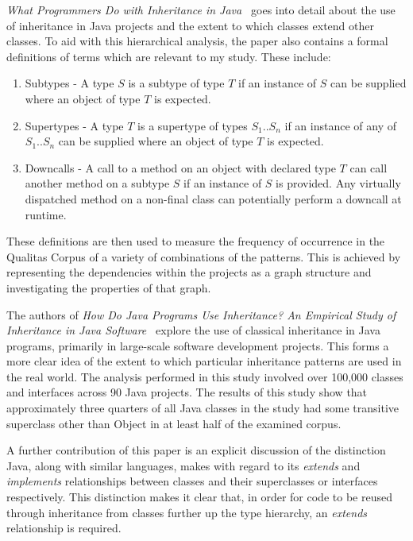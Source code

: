 \textit{What Programmers Do with Inheritance in Java~\cite{InheritanceInJava}} goes into detail about the use of inheritance in Java projects and the extent to which classes extend other classes. To aid with this hierarchical analysis, the paper also contains a formal definitions of terms which are relevant to my study. These include:
\begin{enumerate}
	\item Subtypes - A type $S$ is a subtype of type $T$ if an instance of $S$ can be supplied where an object of type $T$ is expected.
	\item Supertypes - A type $T$ is a supertype of types $S_1..S_n$ if an instance of any of $S_1..S_n$ can be supplied where an object of type $T$ is expected.
	\item Downcalls - A call to a method on an object with declared type $T$ can call another method on a subtype $S$ if an instance of $S$ is provided. Any virtually dispatched method on a non-final class can potentially perform a downcall at runtime.
\end{enumerate}

These definitions are then used to measure the frequency of occurrence in the Qualitas Corpus of a variety of combinations of the patterns. This is achieved by representing the dependencies within the projects as a graph structure and investigating the properties of that graph.
\newline

The authors of \textit{How Do Java Programs Use Inheritance? An Empirical Study of Inheritance in Java Software~\cite{HowProgramsUseInheritance}} explore the use of classical inheritance in Java programs, primarily in large-scale software development projects. This forms a more clear idea of the extent to which particular inheritance patterns are used in the real world. The analysis performed in this study involved over 100,000 classes and interfaces across 90 Java projects. The results of this study show that approximately three quarters of all Java classes in the study had some transitive superclass other than Object in at least half of the examined corpus.
\newline

A further contribution of this paper is an explicit discussion of the distinction Java, along with similar languages, makes with regard to its \textit{extends} and \textit{implements} relationships between classes and their superclasses or interfaces respectively. This distinction makes it clear that, in order for code to be reused through inheritance from classes further up the type hierarchy, an \textit{extends} relationship is required.

